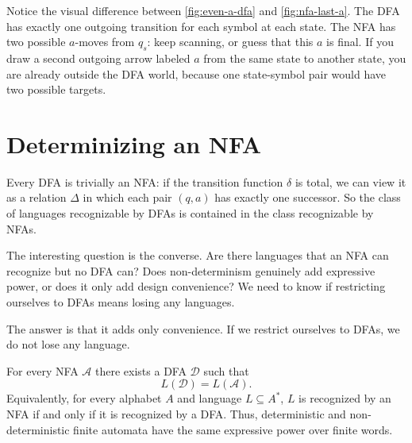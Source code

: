 Notice the visual difference between \cref{fig:even-a-dfa} and
\cref{fig:nfa-last-a}.  The DFA has exactly one outgoing transition for
each symbol at each state.  The NFA has two possible $a$-moves from
$q_s$: keep scanning, or guess that this $a$ is final.  If you draw a
second outgoing arrow labeled $a$ from the same state to another state,
you are already outside the DFA world, because one state-symbol pair
would have two possible targets.


\section{Determinizing an NFA}
\label{sec:subset-construction}

Every DFA is trivially an NFA: if the transition function $\delta$ is
total, we can view it as a relation $\Delta$ in which each pair $(q,a)$
has exactly one successor.  So the class of languages recognizable by
DFAs is contained in the class recognizable by NFAs.

The interesting question is the converse. Are there languages that an
NFA can recognize but no DFA can? Does non-determinism genuinely add
expressive power, or does it only add design convenience? We need to know
if restricting ourselves to DFAs means losing any languages.

The answer is that it adds only convenience.  If we restrict ourselves to
DFAs, we do not lose any language.

\begin{theorem}
\label{thm:subset-construction}
For every NFA $\mathcal{A}$ there exists a DFA $\mathcal{D}$ such that
\[
  L(\mathcal{D})=L(\mathcal{A}).
\]
Equivalently, for every alphabet $A$ and language $L\subseteq A^*$,
$L$ is recognized by an NFA if and only if it is recognized by a DFA.
Thus, deterministic and non-deterministic finite automata have the same
expressive power over finite words.
\end{theorem}

